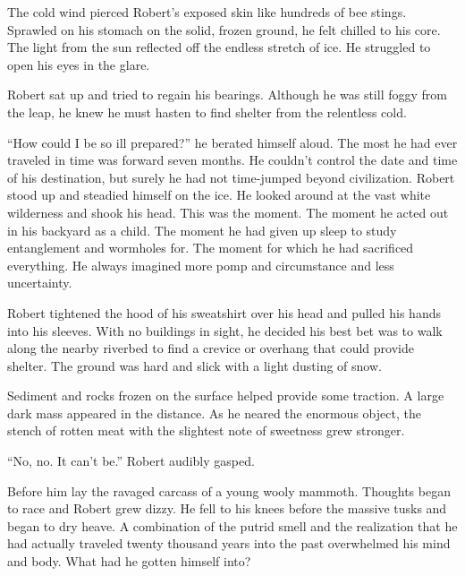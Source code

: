 \documentclass{article}
\begin{document}
\begin{tcolorbox}[colback=white, colframe=my-green, coltitle=black, parskip=5mm, title=
    \textbf{Human-written Story}, breakable]
  \scriptsize
        The cold wind pierced Robert’s exposed skin like hundreds of bee stings. Sprawled on his stomach on the solid, frozen ground, he felt chilled to his core. The light from the sun reflected off the endless stretch of ice. He struggled to open his eyes in the glare. \\\par
        Robert sat up and tried to regain his bearings. Although he was still foggy from the leap, he knew he must hasten to find shelter from the relentless cold.  \\\par
        “How could I be so ill prepared?” he berated himself aloud.
        The most he had ever traveled in time was forward seven months. He couldn’t control the date and time of his destination, but surely he had not time-jumped beyond civilization. Robert stood up and steadied himself on the ice. He looked around at the vast white wilderness and shook his head. This was the moment. The moment he acted out in his backyard as a child. The moment he had given up sleep to study entanglement and wormholes for. The moment for which he had sacrificed everything. He always imagined more pomp and circumstance and less uncertainty.  \\\par
        Robert tightened the hood of his sweatshirt over his head and pulled his hands into his sleeves. With no buildings in sight, he decided his best bet was to walk along the nearby riverbed to find a crevice or overhang that could provide shelter. The ground was hard and slick with a light dusting of snow. \\\par Sediment and rocks frozen on the surface helped provide some traction. A large dark mass appeared in the distance. As he neared the enormous object, the stench of rotten meat with the slightest note of sweetness grew stronger.  \\\par
        “No, no. It can’t be.” Robert audibly gasped.  \\\par
       Before him lay the ravaged carcass of a young wooly mammoth. Thoughts began to race and Robert grew dizzy. He fell to his knees before the massive tusks and began to dry heave. A combination of the putrid smell and the realization that he had actually traveled twenty thousand years into the past overwhelmed his mind and body. What had he gotten himself into?  \\\par

\end{tcolorbox}
\end{document}
